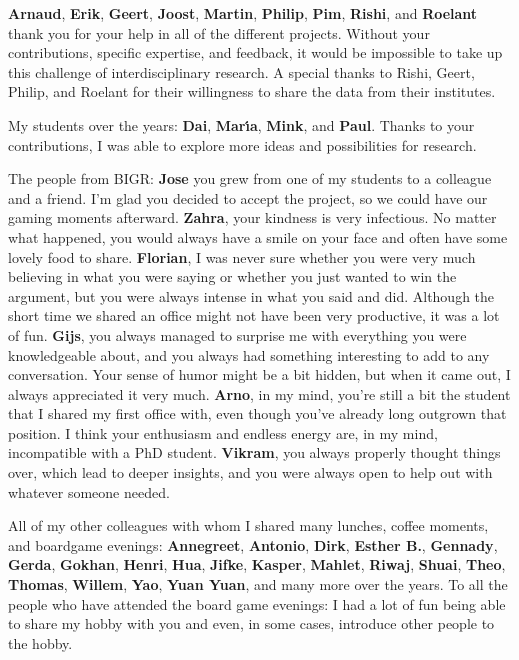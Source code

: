 \textbf{Arnaud}, \textbf{Erik}, \textbf{Geert}, \textbf{Joost}, \textbf{Martin}, \textbf{Philip}, \textbf{Pim}, \textbf{Rishi}, and \textbf{Roelant} thank you for your help in all of the different projects.
Without your contributions, specific expertise, and feedback, it would be impossible to take up this challenge of interdisciplinary research.
A special thanks to Rishi, Geert, Philip, and Roelant for their willingness to share the data from their institutes.

My students over the years: \textbf{Dai}, \textbf{Mar{\'\i}a}, \textbf{Mink}, and \textbf{Paul}.
Thanks to your contributions, I was able to explore more ideas and possibilities for research.

The people from BIGR:
\textbf{Jose} you grew from one of my students to a colleague and a friend.
I'm glad you decided to accept the project, so we could have our gaming moments afterward.
\textbf{Zahra}, your kindness is very infectious.
No matter what happened, you would always have a smile on your face and often have some lovely food to share.
\textbf{Florian}, I was never sure whether you were very much believing in what you were saying or whether you just wanted to win the argument, but you were always intense in what you said and did.
Although the short time we shared an office might not have been very productive, it was a lot of fun.
\textbf{Gijs}, you always managed to surprise me with everything you were knowledgeable about, and you always had something interesting to add to any conversation.
Your sense of humor might be a bit hidden, but when it came out, I always appreciated it very much.
\textbf{Arno}, in my mind, you're still a bit the student that I shared my first office with, even though you've already long outgrown that position.
I think your enthusiasm and endless energy are, in my mind, incompatible with a PhD student.
\textbf{Vikram}, you always properly thought things over, which lead to deeper insights, and you were always open to help out with whatever someone needed.

All of my other colleagues with whom I shared many lunches, coffee moments, and boardgame evenings:
\textbf{Annegreet}, \textbf{Antonio}, \textbf{Dirk}, \textbf{Esther B.}, \textbf{Gennady}, \textbf{Gerda}, \textbf{Gokhan}, \textbf{Henri}, \textbf{Hua}, \textbf{Jifke}, \textbf{Kasper}, \textbf{Mahlet}, \textbf{Riwaj}, \textbf{Shuai}, \textbf{Theo}, \textbf{Thomas}, \textbf{Willem}, \textbf{Yao}, \textbf{Yuan Yuan}, and many more over the years.
To all the people who have attended the board game evenings: I had a lot of fun being able to share my hobby with you and even, in some cases, introduce other people to the hobby.

